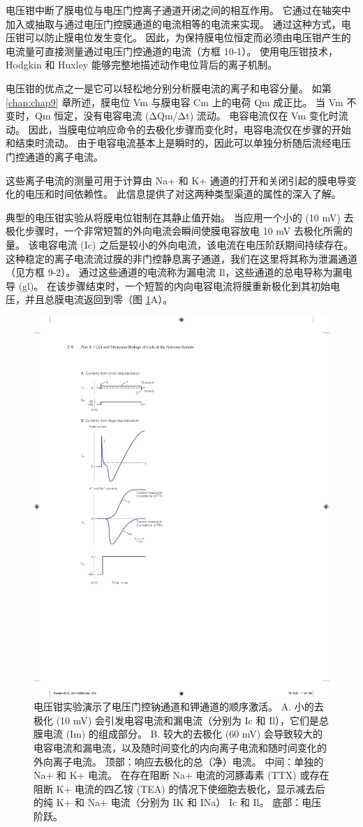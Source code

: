 电压钳中断了膜电位与电压门控离子通道开闭之间的相互作用。 
它通过在轴突中加入或抽取与通过电压门控膜通道的电流相等的电流来实现。 
通过这种方式，电压钳可以防止膜电位发生变化。 
因此，为保持膜电位恒定而必须由电压钳产生的电流量可直接测量通过电压门控通道的电流（方框 10-1）。 
使用电压钳技术，Hodgkin 和 Huxley 能够完整地描述动作电位背后的离子机制。


电压钳的优点之一是它可以轻松地分别分析膜电流的离子和电容分量。 
如第 \ref{chap:chap9} 章所述，膜电位 Vm 与膜电容 Cm 上的电荷 Qm 成正比。 
当 Vm 不变时，Qm 恒定，没有电容电流 (ΔQm/Δt) 流动。 
电容电流仅在 Vm 变化时流动。 因此，当膜电位响应命令的去极化步骤而变化时，电容电流仅在步骤的开始和结束时流动。 
由于电容电流基本上是瞬时的，因此可以单独分析随后流经电压门控通道的离子电流。


这些离子电流的测量可用于计算由 Na+ 和 K+ 通道的打开和关闭引起的膜电导变化的电压和时间依赖性。 
此信息提供了对这两种类型渠道的属性的深入了解。


典型的电压钳实验从将膜电位钳制在其静止值开始。 
当应用一个小的 (10 mV) 去极化步骤时，一个非常短暂的外向电流会瞬间使膜电容放电 10 mV 去极化所需的量。 
该电容电流 (Ic) 之后是较小的外向电流，该电流在电压阶跃期间持续存在。 
这种稳定的离子电流流过膜的非门控静息离子通道，我们在这里将其称为泄漏通道（见方框 9-2）。 
通过这些通道的电流称为漏电流 Il，这些通道的总电导称为漏电导 (gl)。 
在该步骤结束时，一个短暂的内向电容电流将膜重新极化到其初始电压，并且总膜电流返回到零（图 \ref{fig:10_3}A）。

\begin{figure}[htbp]
	\centering
	\includegraphics[width=0.4\linewidth]{chap10/fig_10_3}
	\caption{电压钳实验演示了电压门控钠通道和钾通道的顺序激活。 A. 小的去极化 (10 mV) 会引发电容电流和漏电流（分别为 Ic 和 Il），它们是总膜电流 (Im) 的组成部分。 B. 较大的去极化 (60 mV) 会导致较大的电容电流和漏电流，以及随时间变化的内向离子电流和随时间变化的外向离子电流。 顶部：响应去极化的总（净）电流。 中间：单独的 Na+ 和 K+ 电流。 在存在阻断 Na+ 电流的河豚毒素 (TTX) 或存在阻断 K+ 电流的四乙铵 (TEA) 的情况下使细胞去极化，显示减去后的纯 K+ 和 Na+ 电流（分别为 IK 和 INa） Ic 和 Il。 底部：电压阶跃。}
	\label{fig:10_3}
\end{figure}



